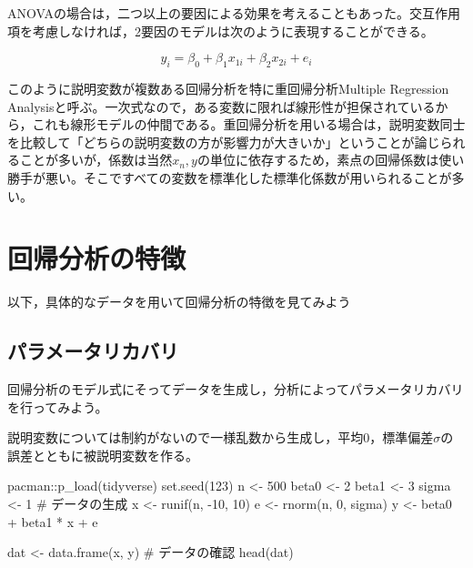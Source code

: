 \documentclass[
  a4paper,
]{ltjsbook}
\newenvironment{Shaded}{\begin{snugshade}}{\end{snugshade}}
\newcommand{\CommentTok}[1]{\textcolor[rgb]{0.37,0.37,0.37}{#1}}
\newcommand{\DecValTok}[1]{\textcolor[rgb]{0.68,0.00,0.00}{#1}}
\newcommand{\FunctionTok}[1]{\textcolor[rgb]{0.28,0.35,0.67}{#1}}
\newcommand{\NormalTok}[1]{\textcolor[rgb]{0.00,0.23,0.31}{#1}}
\newcommand{\OtherTok}[1]{\textcolor[rgb]{0.00,0.23,0.31}{#1}}
\newcommand{\SpecialCharTok}[1]{\textcolor[rgb]{0.37,0.37,0.37}{#1}}
\begin{document}
ANOVAの場合は，二つ以上の要因による効果を考えることもあった。交互作用項を考慮しなければ，2要因のモデルは次のように表現することができる。

\[ y_i = \beta_0 + \beta_1 x_{1i} + \beta_2 x_{2i} + e_i \]

このように説明変数が複数ある回帰分析を特に重回帰分析Multiple Regression
Analysisと呼ぶ。一次式なので，ある変数に限れば線形性が担保されているから，これも線形モデルの仲間である。重回帰分析を用いる場合は，説明変数同士を比較して「どちらの説明変数の方が影響力が大きいか」ということが論じられることが多いが，係数は当然\(x_n, y\)の単位に依存するため，素点の回帰係数は使い勝手が悪い。そこですべての変数を標準化した標準化係数が用いられることが多い。

\section{回帰分析の特徴}\label{ux56deux5e30ux5206ux6790ux306eux7279ux5fb4}

以下，具体的なデータを用いて回帰分析の特徴を見てみよう

\subsection{パラメータリカバリ}\label{ux30d1ux30e9ux30e1ux30fcux30bfux30eaux30abux30d0ux30ea}

回帰分析のモデル式にそってデータを生成し，分析によってパラメータリカバリを行ってみよう。

説明変数については制約がないので一様乱数から生成し，平均0，標準偏差\(\sigma\)の誤差とともに被説明変数を作る。

\begin{Shaded}
\begin{Highlighting}[]
\NormalTok{pacman}\SpecialCharTok{::}\FunctionTok{p\_load}\NormalTok{(tidyverse)}
\FunctionTok{set.seed}\NormalTok{(}\DecValTok{123}\NormalTok{)}
\NormalTok{n }\OtherTok{\textless{}{-}} \DecValTok{500}
\NormalTok{beta0 }\OtherTok{\textless{}{-}} \DecValTok{2}
\NormalTok{beta1 }\OtherTok{\textless{}{-}} \DecValTok{3}
\NormalTok{sigma }\OtherTok{\textless{}{-}} \DecValTok{1}
\CommentTok{\# データの生成}
\NormalTok{x }\OtherTok{\textless{}{-}} \FunctionTok{runif}\NormalTok{(n, }\SpecialCharTok{{-}}\DecValTok{10}\NormalTok{, }\DecValTok{10}\NormalTok{)}
\NormalTok{e }\OtherTok{\textless{}{-}} \FunctionTok{rnorm}\NormalTok{(n, }\DecValTok{0}\NormalTok{, sigma)}
\NormalTok{y }\OtherTok{\textless{}{-}}\NormalTok{ beta0 }\SpecialCharTok{+}\NormalTok{ beta1 }\SpecialCharTok{*}\NormalTok{ x }\SpecialCharTok{+}\NormalTok{ e}

\NormalTok{dat }\OtherTok{\textless{}{-}} \FunctionTok{data.frame}\NormalTok{(x, y)}
\CommentTok{\# データの確認}
\FunctionTok{head}\NormalTok{(dat)}
\end{Highlighting}
\end{Shaded}
\end{document}
